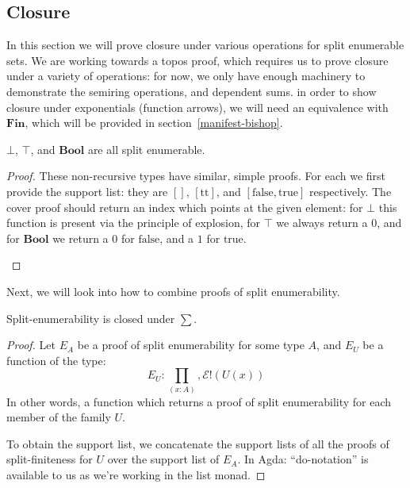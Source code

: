 \subsection{Closure}
In this section we will prove closure under various operations for split
enumerable sets.
We are working towards a topos proof, which requires us to prove closure under
a variety of operations: for now, we only have enough machinery to demonstrate
the semiring operations, and dependent sums.
in order to show closure under exponentials (function arrows), we will need an
equivalence with \(\mathbf{Fin}\), which will be provided in
section~\ref{manifest-bishop}.
\begin{rm-lemma}
  \(\bot\), \(\top\), and \(\mathbf{Bool}\) are all split enumerable.
\end{rm-lemma}
\begin{proof}
  These non-recursive types have similar, simple proofs.
  For each we first provide the support list: they are \([]\), \([\text{tt}]\),
  and \([\text{false}, \text{true}]\) respectively.
  The cover proof should return an index which points at the given element: for
  \(\bot\) this function is present via the principle of explosion, for \(\top\)
  we always return a \(0\), and for \(\mathbf{Bool}\) we return a \(0\) for
  \(\text{false}\), and a \(1\) for \(\text{true}\).
  \begin{multicols}{3}
  \end{multicols}
\end{proof}
Next, we will look into how to combine proofs of split enumerability.
\begin{rm-theorem}
  Split-enumerability is closed under \(\sum\).
\end{rm-theorem}
\begin{proof}
  Let \(E_A\) be a proof of split enumerability for some type \(A\), and \(E_U\)
  be a function of the type:
  \begin{equation}
    E_U : \prod_{(x : A)} , \mathcal{E}!(U(x))
  \end{equation}
  In other words, a function which returns a proof of split enumerability for
  each member of the family \(U\).

  To obtain the support list, we concatenate the support lists of all the proofs
  of split-finiteness for \(U\) over the support list of \(E_A\).
  In Agda:
  ``do-notation'' is available to us as we're working in the list monad.
\end{proof}
